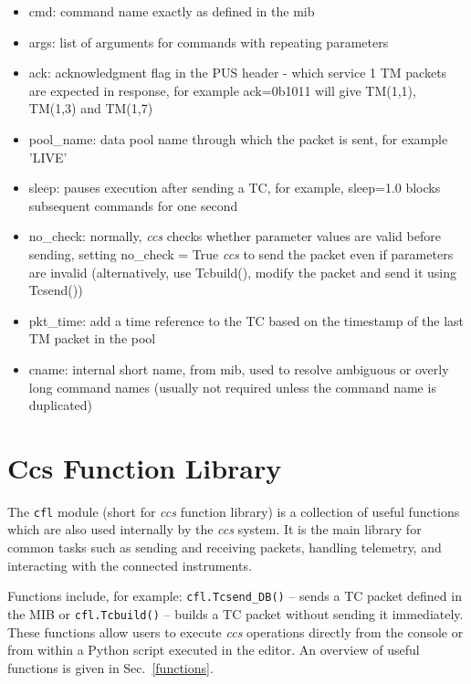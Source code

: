 \begin{itemize}
    \item cmd: command name exactly as defined in the mib

    \item args: list of arguments for commands with repeating parameters

    \item ack: acknowledgment flag in the PUS header - which service 1 TM packets are expected in response, for example ack=0b1011 will give TM(1,1), TM(1,3) and TM(1,7)

    \item pool\_name: data pool name through which the packet is sent, for example 'LIVE'

    \item sleep: pauses execution after sending a TC, for example, sleep=1.0 blocks subsequent commands for one second

    \item no\_check: normally, \textit{ccs} checks whether parameter values are valid before sending, setting no\_check = True \textit{ccs} to send the packet even if parameters are invalid (alternatively, use Tcbuild(), modify the packet and send it using Tcsend())

    \item pkt\_time: add a time reference to the TC based on the timestamp of the last TM packet in the pool

    \item cname: internal short name, from mib, used to resolve ambiguous or overly long command names (usually not required unless the command name is duplicated) 
\end{itemize}


\section{Ccs Function Library}
The \texttt{cfl} module (short for \textit{ccs} function library) is a collection of useful functions which are also used internally by the \textit{ccs} system.
It is the main library for common tasks such as sending and receiving packets, handling telemetry, and interacting with the connected instruments.

Functions include, for example: \texttt{cfl.Tcsend\_DB()} – sends a TC packet defined in the MIB or \texttt{cfl.Tcbuild()} – builds a TC packet without sending it immediately.
These functions allow users to execute \textit{ccs} operations directly from the console or from within a Python script executed in the editor. 
An overview of useful functions is given in Sec.~\ref{functions}.

